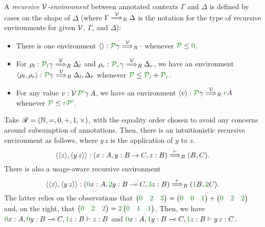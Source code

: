 \begin{definition}\label{def:lr-rec-env}
  A \emph{recursive $\mathcal V$-environment} between annotated contexts $\Gamma$ and
  $\Delta$ is defined by cases on the shape of $\Delta$ (where
  $\Gamma \stackrel{\mathcal V}\Longrightarrow_R \Delta$ is the notation for the
  type of recursive environments for given $\mathcal V$, $\Gamma$, and $\Delta$):
  \begin{itemize}
    \item There is one environment $\alr{} : \grP\gamma \env\V_R {\cdot}$
      whenever $\grP \leq \gr0$.
    \item For $\rho_l : \grPl\gamma \env\V_R \Delta_l$ and
      $\rho_r : \grPr\gamma \env\V_R \Delta_r$, we have an environment
      $\alr{\rho_l, \rho_r} : \grP\gamma \env\V_R \Delta_l, \Delta_r$ whenever
      $\grP \leq \grPl + \grPr$.
    \item For any value $v : \V\,\grPprime\gamma\,A$, we have an environment
      $\alr{v} : \grP\gamma \env\V_R \gr rA$ whenever
      $\grP \leq \gr r\grPprime$.
  \end{itemize}
\end{definition}

\begin{example}
  Take $\Ann = \plr{\mathbb N, =, 0, +, 1, \times}$, with the equality order
  chosen to avoid any concerns around subsumption of annotations.
  Then, there is an intuitionistic recursive environment as follows, where
  $y\,z$ is the application of $y$ to $z$.
  \[
    \alr{\alr{z},\alr{y\,z}} :
    \plr{x : A, y : B \to C, z : B} \env\vdash_R \plr{B, C}.
  \]
  There is also a usage-aware recursive environment
  \[
    \alr{\alr{z},\alr{y\,z}} :
    \plr{\gr0x : A, \gr2y : B \multimap C, \gr3z : B} \env\vdash_R
    \plr{\gr1B, \gr2C}.
  \]
  The latter relies on the observations that
  $\begin{pmatrix} \gr0 & \gr2 & \gr3 \end{pmatrix} =
  \begin{pmatrix} \gr0 & \gr0 & \gr1 \end{pmatrix}
  + \begin{pmatrix} \gr0 & \gr2 & \gr2 \end{pmatrix}$ and, on the right, that
  $\begin{pmatrix} \gr0 & \gr2 & \gr2 \end{pmatrix} =
  \gr2\begin{pmatrix} \gr0 & \gr1 & \gr1 \end{pmatrix}$.
  Then, we have $\gr0x : A, \gr0y : B \multimap C, \gr1z : B \vdash z : B$ and
  $\gr0x : A, \gr1y : B \multimap C, \gr1z : B \vdash y\,z : C$.
\end{example}

